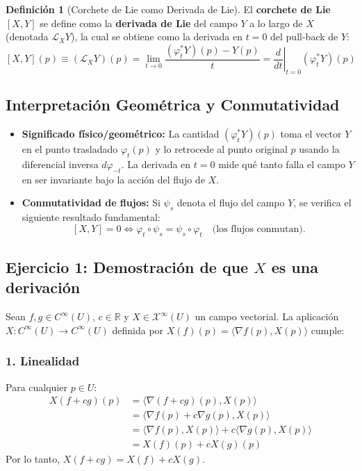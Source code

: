 \documentclass[11pt,a4paper]{article}
\theoremstyle{definition}
\newtheorem{definicion}{Definición}[section]
\theoremstyle{plain}
\theoremstyle{remark}
\begin{document}
	\begin{definicion}[Corchete de Lie como Derivada de Lie]
		El \textbf{corchete de Lie} $[X, Y]$ se define como la \textbf{derivada de Lie} del campo $Y$ a lo largo de $X$ (denotada $\mathcal{L}_X Y$), la cual se obtiene como la derivada en $t=0$ del pull-back de $Y$:
		\[
		[X, Y](p) \equiv (\mathcal{L}_X Y)(p) = \lim_{t \to 0} \frac{(\varphi_t^* Y)(p) - Y(p)}{t} = \left. \frac{d}{dt} \right|_{t=0} (\varphi_t^* Y)(p)
		\]
	\end{definicion}
	
	\subsection*{Interpretación Geométrica y Conmutatividad}
	
	\begin{itemize}
		\item \textbf{Significado físico/geométrico:} La cantidad $(\varphi_t^* Y)(p)$ toma el vector $Y$ en el punto trasladado $\varphi_t(p)$ y lo retrocede al punto original $p$ usando la diferencial inversa $d\varphi_{-t}$. La derivada en $t=0$ mide qué tanto falla el campo $Y$ en ser invariante bajo la acción del flujo de $X$.
		\item \textbf{Conmutatividad de flujos:} Si $\psi_s$ denota el flujo del campo $Y$, se verifica el siguiente resultado fundamental:
		\[
		[X, Y] = 0 \iff \varphi_t \circ \psi_s = \psi_s \circ \varphi_t \quad \text{(los flujos conmutan)}.
		\]
	\end{itemize}
	
	\subsection*{Ejercicio 1: Demostración de que $X$ es una derivación}
	
	Sean $f, g \in C^\infty(U)$, $c \in \mathbb{R}$ y $X \in \mathcal{X}^\infty(U)$ un campo vectorial. La aplicación $X : C^\infty(U) \to C^\infty(U)$ definida por $X(f)(p) = \langle \nabla f(p), X(p) \rangle$ cumple:
	
	\subsubsection*{1. Linealidad}
	Para cualquier $p \in U$:
	\[
	\begin{aligned}
		X(f + c g)(p) &= \langle \nabla(f + cg)(p), X(p) \rangle \\
		&= \langle \nabla f(p) + c \nabla g(p), X(p) \rangle \\
		&= \langle \nabla f(p), X(p) \rangle + c \langle \nabla g(p), X(p) \rangle \\
		&= X(f)(p) + c X(g)(p)
	\end{aligned}
	\]
	Por lo tanto, $X(f + cg) = X(f) + c X(g)$.
	
\end{document}
